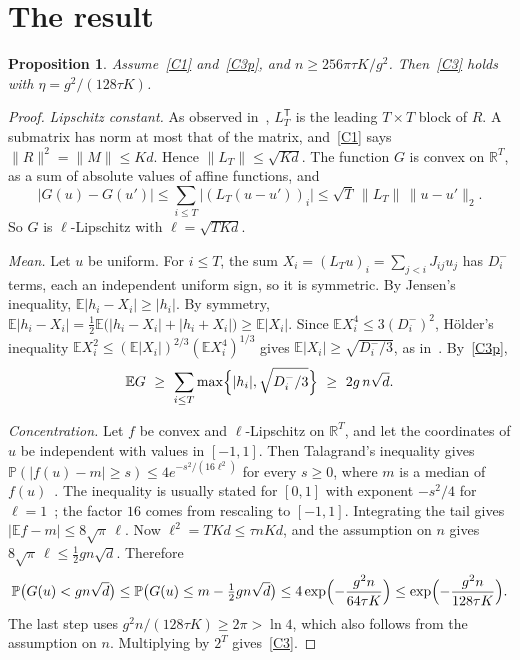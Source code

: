 \documentclass[11pt,a4paper]{article}
\newtheorem{proposition}[theorem]{Proposition}
\theoremstyle{remark}
\newcommand{\E}{\mathbb E}
\newcommand{\Prb}{\mathbb P}
\begin{document}
\section{The result}

\begin{proposition}\label{prop:main}
Assume~\eqref{C1} and~\eqref{C3p}, and $n\ge256\pi\tau K/g^2$. Then~\eqref{C3}
holds with $\eta=g^2/(128\tau K)$.
\end{proposition}

\begin{proof}
\emph{Lipschitz constant.} As observed in~\cite{CC}, $L_T^{\mathsf T}$ is the
leading $T\times T$ block of $R$. A submatrix has norm at most that of the
matrix, and~\eqref{C1} says $\|R\|^2=\|M\|\le Kd$. Hence $\|L_T\|\le\sqrt{Kd}$.
The function $G$ is convex on $\mathbb R^T$, as a sum of absolute values of
affine functions, and
\[
 |G(u)-G(u')|\le\sum_{i\le T}\bigl|(L_T(u-u'))_i\bigr|
 \le\sqrt T\,\|L_T\|\,\|u-u'\|_2 .
\]
So $G$ is $\ell$-Lipschitz with $\ell=\sqrt{TKd}$.

\emph{Mean.} Let $u$ be uniform. For $i\le T$, the sum
$X_i=(L_Tu)_i=\sum_{j<i}J_{ij}u_j$ has $D_i^-$ terms, each an independent
uniform sign, so it is symmetric. By Jensen's inequality,
$\E|h_i-X_i|\ge|h_i|$. By symmetry,
$\E|h_i-X_i|=\frac12\E\bigl(|h_i-X_i|+|h_i+X_i|\bigr)\ge\E|X_i|$. Since
$\E X_i^4\le3(D_i^-)^2$, H\"older's inequality
$\E X_i^2\le(\E|X_i|)^{2/3}(\E X_i^4)^{1/3}$ gives
$\E|X_i|\ge\sqrt{D_i^-/3}$, as in~\cite{EE}. By~\eqref{C3p},
\[
 \E G\ \ge\ \sum_{i\le T}\max\Bigl\{|h_i|,\sqrt{D_i^-/3}\Bigr\}\ \ge\
 2g\,n\sqrt d .
\]

\emph{Concentration.} Let $f$ be convex and $\ell$-Lipschitz on $\mathbb R^T$,
and let the coordinates of $u$ be independent with values in $[-1,1]$. Then
Talagrand's inequality gives
$\Prb(|f(u)-m|\ge s)\le4e^{-s^2/(16\ell^2)}$ for every $s\ge0$, where $m$ is a
median of $f(u)$~\cite{Tal88}. The inequality is usually stated for $[0,1]$
with exponent $-s^2/4$ for $\ell=1$~\cite[Chapter~4]{Led01}; the factor $16$
comes from rescaling to $[-1,1]$. Integrating the tail gives
$|\E f-m|\le8\sqrt\pi\,\ell$. Now $\ell^2=TKd\le\tau nKd$, and the assumption
on $n$ gives $8\sqrt\pi\,\ell\le\frac12gn\sqrt d$. Therefore
\[
 \Prb\bigl(G(u)<gn\sqrt d\bigr)\le
 \Prb\bigl(G(u)\le m-\tfrac12gn\sqrt d\bigr)\le
 4\exp\Bigl(-\frac{g^2n}{64\tau K}\Bigr)\le
 \exp\Bigl(-\frac{g^2n}{128\tau K}\Bigr).
\]
The last step uses $g^2n/(128\tau K)\ge2\pi>\ln4$, which also follows from
the assumption on $n$. Multiplying by $2^T$ gives~\eqref{C3}.
\end{proof}
\end{document}
